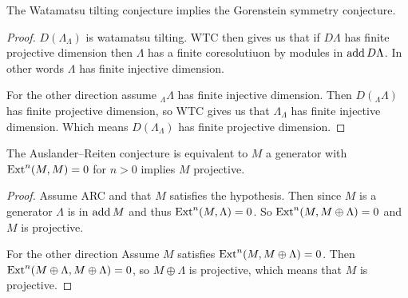 \begin{theorem}
	The Watamatsu tilting conjecture implies the Gorenstein symmetry conjecture.
	\begin{proof}
	$D(\Lambda_\Lambda)$ is watamatsu tilting. WTC then gives us that if $D\Lambda$ has finite projective dimension then $\Lambda$ has a finite coresolutiuon by modules in $\operatorname{add} D\Lambda$. In other words $\Lambda$ has finite injective dimension.
	
	For the other direction assume $_\Lambda\Lambda$ has finite injective dimension. Then $D(_\Lambda\Lambda)$ has finite projective dimension, so WTC gives us that $\Lambda_\Lambda$ has finite injective dimension. Which means $D(\Lambda_\Lambda)$ has finite projective dimension.
	\end{proof}
\end{theorem}

\begin{prop}
	The Auslander--Reiten conjecture is equivalent to $M$ a generator with $\operatorname{Ext}^n(M, M) = 0$ for $n > 0$ implies $M$ projective.
	\begin{proof}
		Assume ARC and that $M$ satisfies the hypothesis. Then since $M$ is a generator $\Lambda$ is in $\operatorname{add} M$ and thus $\operatorname{Ext}^n(M, \Lambda)=0$. So $\operatorname{Ext}^n(M, M\oplus \Lambda)=0$ and $M$ is projective.
		
		For the other direction Assume $M$ satisfies $\operatorname{Ext}^n(M, M \oplus \Lambda)=0$. Then $\operatorname{Ext}^n(M \oplus \Lambda, M\oplus \Lambda) = 0$, so $M \oplus \Lambda$ is projective, which means that $M$ is projective. 
	\end{proof}
\end{prop}

